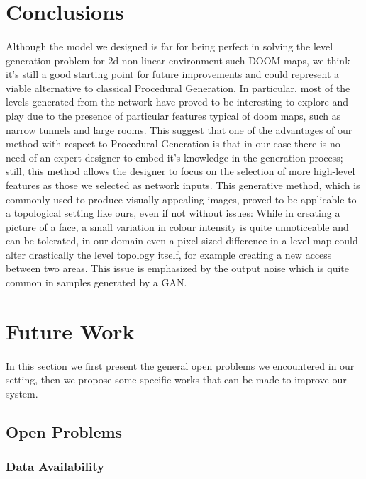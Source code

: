 \section{Conclusions}
\label{sec:conclusions}
\paragraph{} Although the model we designed is far for being perfect in solving the level generation problem for 2d non-linear environment such DOOM maps, we think it's still a good starting point for future improvements and could represent a viable alternative to classical Procedural Generation. In particular, most of the levels generated from the network have proved to be interesting to explore and play due to the presence of particular features typical of doom maps, such as narrow tunnels and large rooms. This suggest that one of the advantages of our method with respect to Procedural Generation is that in our case there is no need of an expert designer to embed it's knowledge in the generation process; still, this method allows the designer to focus on the selection of more high-level features as those we selected as network inputs. This generative method, which is commonly used to produce visually appealing images, proved to be applicable to a topological setting like ours, even if not without issues: While in creating a picture of a face, a small variation in colour intensity is quite unnoticeable and can be tolerated, in our domain even a pixel-sized difference in a level map could alter drastically the level topology itself, for example creating a new access between two areas. This issue is emphasized by the output noise which is quite common in samples generated by a GAN.



\section{Future Work}
\label{sec:futurework}
\paragraph{} In this section we first present the general open problems we encountered in our setting, then we propose some specific works that can be made to improve our system.
\subsection{Open Problems}
\subsubsection{Data Availability}
